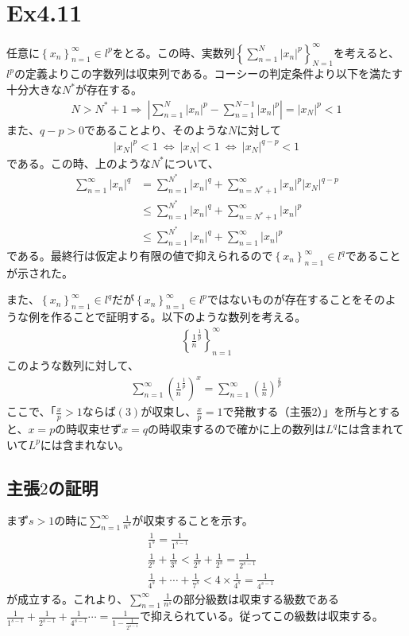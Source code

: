 \documentclass{article}
\begin{document}
\section{Ex4.11}
任意に$\left\{ x_n \right\}_{n = 1}^{\infty} \in l^p$をとる。この時、実数列$\left\{ \sum_{n = 1}^N |x_n|^p \right\}_{N = 1}^{\infty}$を考えると、$l^p$の定義よりこの字数列は収束列である。コーシーの判定条件より以下を満たす十分大きな$N^*$が存在する。
\begin{align*}
	N > N^* + 1 \Rightarrow\ \left| \sum_{n = 1}^N |x_n|^p - \sum_{n = 1}^{N-1} |x_n|^p \right| = |x_N|^p < 1
\end{align*}
また、$q- p > 0$であることより、そのような$N$に対して
\begin{align*}
	|x_N|^p < 1\ \Leftrightarrow\ |x_N| < 1\ \Leftrightarrow\ |x_N|^{q-p} < 1
\end{align*}
である。この時、上のような$N^*$について、
\begin{align*}
	\sum_{n = 1}^{\infty} |x_n|^q &= \sum_{n = 1}^{N^*} |x_n|^q + \sum_{n = N^* +1}^\infty |x_n|^p |x_N|^{q-p}\\
	&\leq \sum_{n = 1}^{N^*} |x_n|^q + \sum_{n = N^* +1}^\infty |x_n|^p\\
	&\leq \sum_{n = 1}^{N^*} |x_n|^q + \sum_{n =1}^\infty |x_n|^p
\end{align*}
である。最終行は仮定より有限の値で抑えられるので$\left\{ x_n \right\}_{n = 1}^{\infty} \in l^q$であることが示された。

また、$\left\{ x_n \right\}_{n = 1}^{\infty} \in l^q$だが$\left\{ x_n \right\}_{n = 1}^{\infty} \in l^p$ではないものが存在することをそのような例を作ることで証明する。以下のような数列を考える。
\begin{align*}
	\left\{ \frac{1}{n}^{\frac{1}{p}} \right\}_{n = 1}^{\infty}
\end{align*}
このような数列に対して、
\begin{align}
	\sum_{n = 1}^{\infty} \left( \frac{1}{n}^{\frac{1}{p}} \right)^{x} = \sum_{n = 1}^{\infty} \left(\frac{1}{n}\right)^{\frac{x}{p}}
\end{align}
ここで、「$\frac{x}{p} > 1$ならば$(3)$が収束し、$\frac{x}{p} = 1$で発散する（主張$2$）」を所与とすると、$x = p$の時収束せず$x = q$の時収束するので確かに上の数列は$L^q$には含まれていて$L^p$には含まれない。

\subsection{主張$2$の証明}
まず$s > 1$の時に$\sum_{n = 1}^{\infty} \frac{1}{n^s}$が収束することを示す。
\begin{align*}
	&\frac{1}{1^s} = \frac{1}{1^{s-1}}\\
	&\frac{1}{2^s} + \frac{1}{3^s} < \frac{1}{2^s} + \frac{1}{2^s} = \frac{1}{2^{s-1}}\\
	&\frac{1}{4^s} + \cdots + \frac{1}{7^s} < 4 \times \frac{1}{4^s} = \frac{1}{4^{s-1}}
\end{align*}
が成立する。これより、$\sum_{n = 1}^{\infty} \frac{1}{n^s}$の部分級数は収束する級数である$\frac{1}{1^{s-1}} + \frac{1}{2^{s-1}} + \frac{1}{4^{s-1}} \cdots = \frac{1}{1 - \frac{1}{2^{s-1}}}$で抑えられている。従ってこの級数は収束する。
\end{document}
